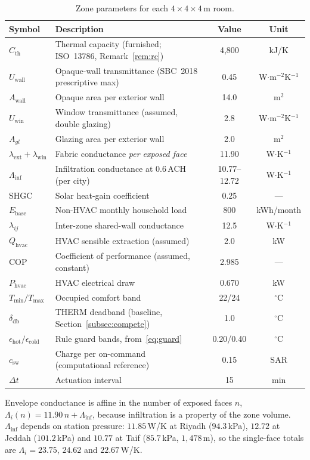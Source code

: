 \documentclass[3p,twocolumn,number]{elsarticle}
\newcommand{\Tmin}{T_{\min}}
\newcommand{\Tmax}{T_{\max}}
\newcommand{\deadband}{\delta_{\mathrm{db}}}
\newcommand{\Cth}{C_{\mathrm{th}}}
\newcommand{\lext}{\lambda_{\mathrm{ext}}}
\newcommand{\lwin}{\lambda_{\mathrm{win}}}
\newcommand{\lij}{\lambda_{ij}}
\newcommand{\Qhvac}{Q_{\mathrm{hvac}}}
\newcommand{\csw}{c_{\mathrm{sw}}}
\newcommand{\Phvac}{P_{\mathrm{hvac}}}
\begin{document}
\begin{table}[t]
\centering
\caption{Zone parameters for each $4\times4\times4\,\text{m}$ room.}
\label{tab:params}
\setlength{\tabcolsep}{4.5pt}
\begin{tabularx}{\linewidth}{lXcc}
\toprule
Symbol & Description & Value & Unit \\
\midrule
$\Cth$   & Thermal capacity (furnished; ISO~13786, Remark~\ref{rem:rc}) & 4{,}800 & kJ/K\\
$U_{\mathrm{wall}}$ & Opaque-wall transmittance (SBC~2018 prescriptive max) & 0.45 & W$\cdot$m$^{-2}$K$^{-1}$ \\
$A_{\mathrm{wall}}$ & Opaque area per exterior wall & 14.0 & m$^2$ \\
$U_{\mathrm{win}}$ & Window transmittance (assumed, double glazing) & 2.8 & W$\cdot$m$^{-2}$K$^{-1}$ \\
$A_{gl}$ & Glazing area per exterior wall            & 2.0 & m$^2$ \\
$\lext+\lwin$ & Fabric conductance \emph{per exposed face} & 11.90 & W$\cdot$K$^{-1}$ \\
$\Lambda_{\mathrm{inf}}$ & Infiltration conductance at $0.6\,$ACH (per city) & 10.77--12.72 & W$\cdot$K$^{-1}$ \\
SHGC     & Solar heat-gain coefficient               & 0.25 & --- \\
$E_{\mathrm{base}}$ & Non-HVAC monthly household load  & 800 & kWh/month \\
$\lij$   & Inter-zone shared-wall conductance         & 12.5 & W$\cdot$K$^{-1}$ \\
$\Qhvac$ & HVAC sensible extraction (assumed)        &  2.0 & kW \\
COP      & Coefficient of performance (assumed, constant) & 2.985 & --- \\
$\Phvac$ & HVAC electrical draw                       & 0.670 & kW \\
$\Tmin/\Tmax$ & Occupied comfort band                & 22/24 & $^\circ$C \\
$\deadband$ & THERM deadband (baseline, Section~\ref{subsec:compete}) & 1.0 & $^\circ$C \\
$\epsilon_{\mathrm{hot}}/\epsilon_{\mathrm{cold}}$ & Rule guard bands, from~\eqref{eq:guard} & 0.20/0.40 & $^\circ$C \\
$\csw$       & Charge per on-command (computational reference) & 0.15 & SAR \\
$\Delta t$  & Actuation interval                      &   15 & min \\
\bottomrule
\end{tabularx}
\vspace{2pt}
{\footnotesize\raggedright
Envelope conductance is affine in the number of exposed faces $n$,
$\Lambda_i(n)=11.90\,n+\Lambda_{\mathrm{inf}}$, because infiltration is a
property of the zone volume. $\Lambda_{\mathrm{inf}}$ depends on station
pressure: $11.85\,$W/K at Riyadh ($94.3\,$kPa), $12.72$ at Jeddah
($101.2\,$kPa) and $10.77$ at Taif ($85.7\,$kPa, $1{,}478\,$m), so the
single-face totals are $\Lambda_i=23.75$, $24.62$ and $22.67\,$W/K.\par}
\end{table}
\end{document}
